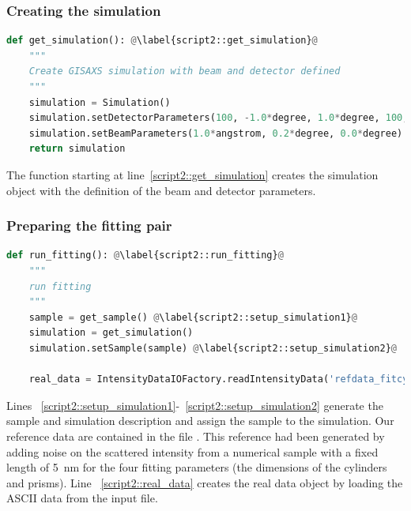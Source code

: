 \subsubsection*{Creating the simulation}
\begin{lstlisting}[language=python, style=eclipseboxed, firstnumber=35]
def get_simulation(): @\label{script2::get_simulation}@
    """
    Create GISAXS simulation with beam and detector defined
    """
    simulation = Simulation()
    simulation.setDetectorParameters(100, -1.0*degree, 1.0*degree, 100, 0.0*degree, 2.0*degree)
    simulation.setBeamParameters(1.0*angstrom, 0.2*degree, 0.0*degree)
    return simulation
\end{lstlisting}
The function starting at line~\ref{script2::get_simulation} creates
the simulation object with the definition of the beam and detector parameters.

\subsubsection*{Preparing the fitting pair}
\begin{lstlisting}[language=python, style=eclipseboxed, firstnumber=45]
def run_fitting(): @\label{script2::run_fitting}@
    """
    run fitting
    """
    sample = get_sample() @\label{script2::setup_simulation1}@
    simulation = get_simulation()
    simulation.setSample(sample) @\label{script2::setup_simulation2}@

    real_data = IntensityDataIOFactory.readIntensityData('refdata_fitcylinderprisms.int.gz') @\label{script2::real_data}@
\end{lstlisting}
Lines
~\ref{script2::setup_simulation1}-~\ref{script2::setup_simulation2}
generate the
sample and simulation description and assign the sample to the simulation.
Our reference data are contained in the file .
 This reference had been generated by adding noise
on the scattered intensity from a numerical sample with a fixed length of 5~nm for the four fitting
parameters (\idest the dimensions of the cylinders and prisms).
Line ~\ref{script2::real_data} creates the real data object by loading
the ASCII data from the input file.

